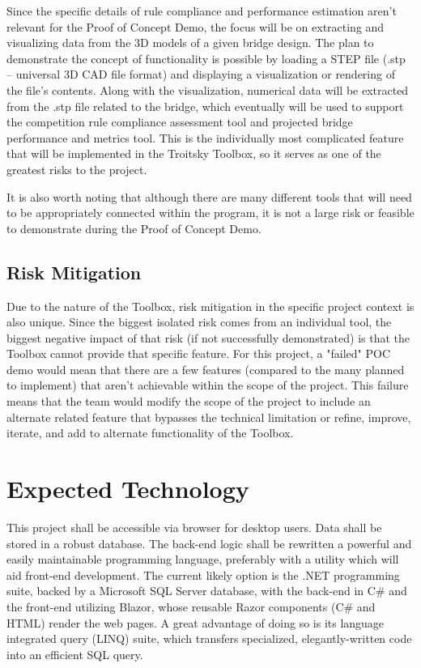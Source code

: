 \documentclass{article}
\begin{document}
Since the specific details of rule compliance and performance estimation aren't relevant for the Proof of Concept Demo, the focus will be on extracting and visualizing data from the 3D models of a given bridge design.
The plan to demonstrate the concept of functionality is possible by loading a STEP file (.stp -- universal 3D CAD file format) and displaying a visualization or rendering of the file's contents. 
Along with the visualization, numerical data will be extracted from the .stp file related to the bridge, which eventually will be used to support the competition rule compliance assessment tool and projected bridge performance and metrics tool.
This is the individually most complicated feature that will be implemented in the Troitsky Toolbox, so it serves as one of the greatest risks to the project.

It is also worth noting that although there are many different tools that will need to be appropriately connected within the program, it is not a large risk or feasible to demonstrate during the Proof of Concept Demo.

\subsection{Risk Mitigation}
Due to the nature of the Toolbox, risk mitigation in the specific project context is also unique.
Since the biggest isolated risk comes from an individual tool, the biggest negative impact of that risk (if not successfully demonstrated) is that the Toolbox cannot provide that specific feature.
For this project, a "failed" POC demo would mean that there are a few features (compared to the many planned to implement) that aren't achievable within the scope of the project.
This failure means that the team would modify the scope of the project to include an alternate related feature that bypasses the technical limitation or refine, improve, iterate, and add to alternate functionality of the Toolbox.



\section{Expected Technology}
This project shall be accessible via browser for desktop users. Data shall be stored in a robust database.
The back-end logic shall be rewritten a powerful and easily maintainable programming language, preferably with
a utility which will aid front-end development. The current likely option is the .NET programming
suite, backed by a Microsoft SQL Server database, with the back-end in C\# and the front-end utilizing
Blazor, whose reusable Razor components (C\# and HTML) render the web pages. A great advantage of doing so is its 
language integrated query (LINQ) suite, which transfers specialized, elegantly-written code into an efficient SQL query. 
\end{document}
